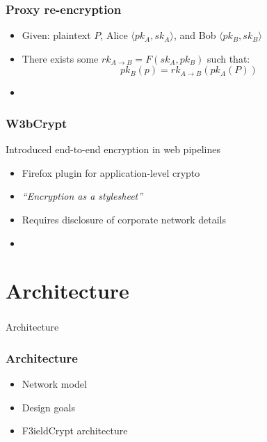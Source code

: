\documentclass{beamer}
\begin{document}

\begin{frame}
\frametitle{Proxy re-encryption}
\begin{itemize}
\item Given: plaintext $P$, Alice $\langle pk_A, sk_A \rangle$, and Bob
$\langle pk_B, sk_B \rangle$
\item There exists some $rk_{A \to B} = F(sk_A, pk_B)$ such that:
\begin{equation*}
pk_B(p) = rk_{A \to B}( pk_A (P))
\end{equation*}
\item \cite{atomic_proxy_reencryption} 
\end{itemize}
\end{frame}

\begin{frame}
\frametitle{W3bCrypt}
Introduced end-to-end encryption in web pipelines
\smallskip
\begin{itemize}
\item Firefox plugin for application-level crypto
\item \emph{``Encryption as a stylesheet''}
\item Requires disclosure of corporate network details
\item \cite{w3bcrypt} 
\end{itemize}
\end{frame}

\section{Architecture}
\begin{frame}
\frametitle{}
\begin{center}
Architecture
\end{center}
\end{frame}

\begin{frame}
\frametitle{Architecture}
\begin{itemize}
\item Network model
\item Design goals
\item F3ieldCrypt architecture
\end{itemize}
\end{frame}
\end{document}
